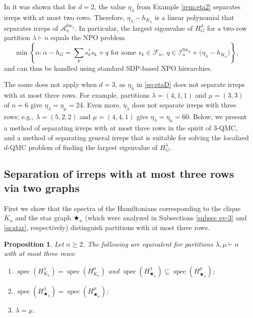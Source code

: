 \documentclass[12pt,dvipsnames,accepted=2016-08-18,a4paper,onecolumn]{quantumarticle}
\def\starn{{\bigstar_{n}}}
\DeclareMathOperator{\spec}{spec}
\numberwithin{equation}{section}
\newcommand{\cA}{\mathcal A}
\newcommand{\cF}{\mathcal F}
\newtheorem{proposition}[theorem]{Proposition}
\theoremstyle{definition}
\begin{document}
In \cite{BCEHK24} it was shown that for $d=2$, the value $\eta_\lambda$ from Example \ref{rem:eta2} separates irreps with at most two rows. 
Therefore, $\eta_\lambda-h_{K_n}$ is a linear polynomial that separates irreps of $\cA^{\text{Sw}_2}_n$.
In particular, the largest eigenvalue of $H_G^\lambda$ for a two-row partition $\lambda\vdash n$ equals the NPO problem
$$
\min\left\{
\alpha:\alpha-h_G=\sum_k s_k^*s_k+q  
\text{ for some } 
s_k\in\cF_n,\ q\in \mathcal{I}^{\text{Sw}_d}_n
+\big(\eta_\lambda-h_{K_n}\big)
\right\},
$$
and can thus be handled using standard SDP-based NPO hierarchies.

The same does not apply when $d=3$, as $\eta_\lambda$ in \eqref{eq:etaD} does not separate irreps with at most three rows. For example, partitions $\lambda = (4,1,1)$  and $\mu = (3,3)$ of $n=6$ give $\eta_{\lambda} = \eta_{\mu}=24$. 
Even more, $\eta_\lambda$ does not separate irreps with three rows; e.g., $\lambda=(5,2,2)$ and $\mu=(4,4,1)$ give $\eta_{\lambda}=\eta_{\mu}=60$.
Below, we present a method of separating irreps with at most three rows in the spirit of $3$-QMC, and a method of separating general irreps that is suitable for solving the localized $d$-QMC problem of finding the largest eigenvalue of $H_G^\lambda$.

\subsection{Separation of irreps with at most three rows via two graphs}

First we show that the spectra of the Hamiltonians corresponding to the clique $K_n$ and the star graph $\starn$ (which were analyzed in Subsections \ref{subsec ev-3} and \ref{ss:star}, respectively) distinguish partitions with at most three rows.

\begin{proposition}\label{p:sep3}
Let $n\ge2$. The following are equivalent for partitions $\lambda,\mu\vdash n$ with at most three rows:
\begin{enumerate}[\rm (i)]
\item $\spec(H_{K_n}^{\lambda})=\spec(H_{K_n}^{\mu})$ and $\spec(H_{\starn}^{\lambda})\subseteq\spec(H_{\starn}^{\mu})$;
\item $\spec(H_{\starn}^{\lambda})=\spec(H_{\starn}^{\mu})$;
\item ${\lambda}={\mu}$.
\end{enumerate}
\end{proposition}
\end{document}
